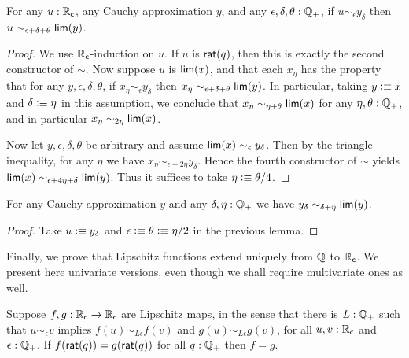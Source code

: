 \begin{lem}\label{thm:RC-sim-lim}
  For any $u:\mathbb{R}_\mathsf{c}$, any Cauchy approximation $y$, and any $\epsilon,\delta,\theta:\mathbb{Q}_{+}$, if $u\sim_\epsilon y_\delta$ then $u\sim_{\epsilon+\delta+\theta} \mathsf{lim}(y)$.
\end{lem}
\begin{proof}
  We use $\mathbb{R}_\mathsf{c}$-induction on $u$.
  If $u$ is $\mathsf{rat}(q)$, then this is exactly the second constructor of $\sim$.
  Now suppose $u$ is $\mathsf{lim}(x)$, and that each $x_\eta$ has the property that for any $y,\epsilon,\delta,\theta$, if $x_\eta\sim_\epsilon y_\delta$ then $x_\eta \sim_{\epsilon+\delta+\theta} \mathsf{lim}(y)$.
  In particular, taking $y\vcentcolon\equiv x$ and $\delta\vcentcolon\equiv\eta$ in this assumption, we conclude that $x_\eta \sim_{\eta+\theta} \mathsf{lim}(x)$ for any $\eta,\theta:\mathbb{Q}_{+}$, and in particular $x_\eta \sim_{2\eta} \mathsf{lim}(x)$.

  Now let $y,\epsilon,\delta,\theta$ be arbitrary and assume $\mathsf{lim}(x) \sim_\epsilon y_\delta$.
  Then by the triangle inequality, for any $\eta$ we have $x_\eta \sim_{\epsilon+2\eta} y_\delta$.
  Hence the fourth constructor of $\sim$ yields $\mathsf{lim}(x) \sim_{\epsilon+4\eta+\delta} \mathsf{lim}(y)$.
  Thus it suffices to take $\eta \vcentcolon\equiv \theta/4$.
\end{proof}

\begin{lem}\label{thm:RC-sim-lim-term}
  For any Cauchy approximation $y$ and any $\delta,\eta:\mathbb{Q}_{+}$ we have $y_\delta \sim_{\delta+\eta} \mathsf{lim}(y)$.
\end{lem}
\begin{proof}
  Take $u\vcentcolon\equiv y_\delta$ and $\epsilon\vcentcolon\equiv\theta\vcentcolon\equiv \eta/2$ in the previous lemma.
\end{proof}

Finally, we prove that Lipschitz functions extend uniquely from $\mathbb{Q}$ to $\mathbb{R}_\mathsf{c}$.
We present here univariate versions, even though we shall require multivariate ones as well.

\begin{lem} \label{RC-Lipschitz-eq}
  Suppose $f,g : \mathbb{R}_\mathsf{c} \to \mathbb{R}_\mathsf{c}$ are Lipschitz maps, in the sense that there is $L : \mathbb{Q}_{+}$
  such that $u \sim_\epsilon v$ implies $f(u) \sim_{L \epsilon} f(v)$ and $g(u) \sim_{L
    \epsilon} g(v)$, for all $u, v : \mathbb{R}_\mathsf{c}$ and $\epsilon : \mathbb{Q}_{+}$. If $f(\mathsf{rat}(q)) =
  g(\mathsf{rat}(q))$ for all $q : \mathbb{Q}_{+}$ then $f = g$.
\end{lem}

